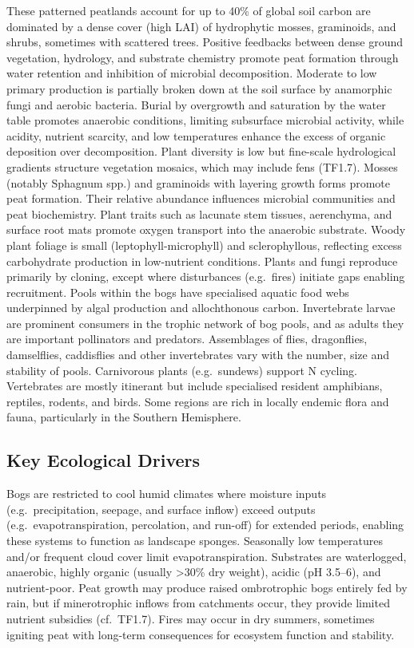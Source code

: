 \documentclass[
  letterpaper,
  DIV=11,
  numbers=noendperiod]{scrartcl}
\begin{document}
These patterned peatlands account for up to 40\% of global soil carbon
are dominated by a dense cover (high LAI) of hydrophytic mosses,
graminoids, and shrubs, sometimes with scattered trees. Positive
feedbacks between dense ground vegetation, hydrology, and substrate
chemistry promote peat formation through water retention and inhibition
of microbial decomposition. Moderate to low primary production is
partially broken down at the soil surface by anamorphic fungi and
aerobic bacteria. Burial by overgrowth and saturation by the water table
promotes anaerobic conditions, limiting subsurface microbial activity,
while acidity, nutrient scarcity, and low temperatures enhance the
excess of organic deposition over decomposition. Plant diversity is low
but fine-scale hydrological gradients structure vegetation mosaics,
which may include fens (TF1.7). Mosses (notably Sphagnum spp.) and
graminoids with layering growth forms promote peat formation. Their
relative abundance influences microbial communities and peat
biochemistry. Plant traits such as lacunate stem tissues, aerenchyma,
and surface root mats promote oxygen transport into the anaerobic
substrate. Woody plant foliage is small (leptophyll-microphyll) and
sclerophyllous, reflecting excess carbohydrate production in
low-nutrient conditions. Plants and fungi reproduce primarily by
cloning, except where disturbances (e.g.~fires) initiate gaps enabling
recruitment. Pools within the bogs have specialised aquatic food webs
underpinned by algal production and allochthonous carbon. Invertebrate
larvae are prominent consumers in the trophic network of bog pools, and
as adults they are important pollinators and predators. Assemblages of
flies, dragonflies, damselflies, caddisflies and other invertebrates
vary with the number, size and stability of pools. Carnivorous plants
(e.g.~sundews) support N cycling. Vertebrates are mostly itinerant but
include specialised resident amphibians, reptiles, rodents, and birds.
Some regions are rich in locally endemic flora and fauna, particularly
in the Southern Hemisphere.

\subsection{Key Ecological Drivers}\label{key-ecological-drivers-108}

Bogs are restricted to cool humid climates where moisture inputs
(e.g.~precipitation, seepage, and surface inflow) exceed outputs
(e.g.~evapotranspiration, percolation, and run-off) for extended
periods, enabling these systems to function as landscape sponges.
Seasonally low temperatures and/or frequent cloud cover limit
evapotranspiration. Substrates are waterlogged, anaerobic, highly
organic (usually \textgreater30\% dry weight), acidic (pH 3.5--6), and
nutrient-poor. Peat growth may produce raised ombrotrophic bogs entirely
fed by rain, but if minerotrophic inflows from catchments occur, they
provide limited nutrient subsidies (cf.~TF1.7). Fires may occur in dry
summers, sometimes igniting peat with long-term consequences for
ecosystem function and stability.
\end{document}
